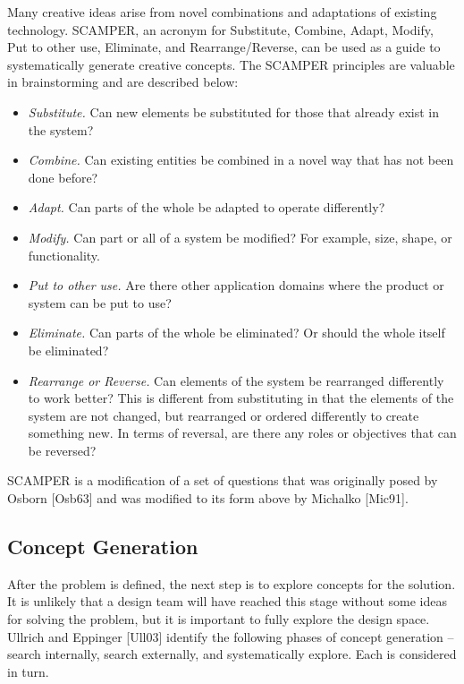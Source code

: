 Many creative ideas arise from novel combinations and adaptations of
existing technology. SCAMPER, an acronym for Substitute, Combine, Adapt,
Modify, Put to other use, Eliminate, and Rearrange/Reverse, can be used
as a guide to systematically generate creative concepts. The SCAMPER
principles are valuable in brainstorming and are described below:

\begin{itemize}
\item
  \emph{Substitute.} Can new elements be substituted for those that
  already exist in the system?
\item
  \emph{Combine.} Can existing entities be combined in a novel way that
  has not been done be­fore?
\item
  \emph{Adapt.} Can parts of the whole be adapted to operate
  differently?
\item
  \emph{Modify.} Can part or all of a system be modified? For example,
  size, shape, or functional­ity.
\item
  \emph{Put to other use.} Are there other application domains where the
  product or system can be put to use?
\item
  \emph{Eliminate.} Can parts of the whole be eliminated? Or should the
  whole itself be elimi­nated?
\item
  \emph{Rearrange or Reverse.} Can elements of the system be rearranged
  differently to work bet­ter? This is different from substituting in
  that the elements of the system are not changed, but rearranged or
  ordered differently to create something new. In terms of reversal, are
  there any roles or objectives that can be reversed?
\end{itemize}

SCAMPER is a modification of a set of questions that was originally
posed by Osborn {[}Osb63{]} and was modified to its form above by
Michalko {[}Mic91{]}.

\subsection{Concept Generation}\label{concept-generation}

After the problem is defined, the next step is to explore concepts for
the solution. It is unlikely that a design team will have reached this
stage without some ideas for solving the problem, but it is important to
fully explore the design space. Ullrich and Eppinger {[}Ull03{]}
identify the following phases of concept generation -- search
internally, search externally, and systematically explore. Each is
considered in turn.

